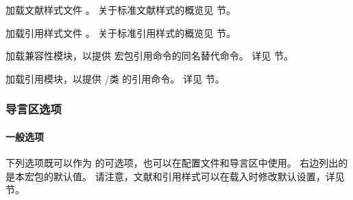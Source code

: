 \begin{optionlist}
加载文献样式文件 。
关于标准文献样式的概览见  节。



加载引用样式文件 。
关于标准引用样式的概览见  节。



加载兼容性模块，以提供  宏包引用命令的同名替代命令。
详见  节。



加载引用模块，以提供 \slash 类  的引用命令。
详见  节。

\end{optionlist}

\subsubsection{导言区选项}
\label{use:opt:pre}

\paragraph{一般选项}
\label{use:opt:pre:gen}


下列选项既可以作为  的可选项，也可以在配置文件和导言区中使用。
右边列出的是本宏包的默认值。
请注意，文献和引用样式可以在载入时修改默认设置，详见  节。


